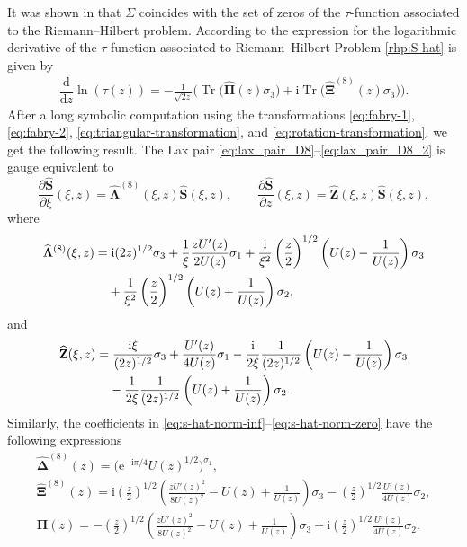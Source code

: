 \documentclass[pdftex]{sigma}
\numberwithin{equation}{section}
\newcommand{\ee}{\mathrm{e}}
\newcommand{\ii}{\mathrm{i}}
\newcommand{\Tr}{\operatorname{Tr}}
\begin{document}
It was shown in \cite{Palmer} that $\Sigma$ coincides with the set of zeros of the $\tau$-function associated to the Riemann--Hilbert problem. According to \cite{JMU} the expression for the logarithmic derivative of the $\tau$-function associated to Riemann--Hilbert Problem \ref{rhp:S-hat} is given by
\begin{gather} \label{eq:jmu-tau}
\dfrac{\mathrm{d}}{\mathrm{d}z}\ln(\tau(z))=-\frac{1}{\sqrt{2z}}\big(\Tr\big(\widehat{\mathbf{\Pi}}(z)\sigma_3\big)+\ii\Tr\big(\widehat{\mathbf{\Xi}}^{(8)}(z)\sigma_3\big)\big).
\end{gather}
 After a long symbolic computation using the transformations \eqref{eq:fabry-1}, \eqref{eq:fabry-2}, \eqref{eq:triangular-transformation}, and \eqref{eq:rotation-transformation}, we get the following result. The Lax pair \eqref{eq:lax_pair_D8}--\eqref{eq:lax_pair_D8_2} is gauge equivalent to
\[
\frac{\partial\widehat{\mathbf{S}}}{\partial\xi} (\xi, z) = {\widehat{\mathbf{\Lambda}}}^{(8)}(\xi, z) \widehat{\mathbf{S}}(\xi, z), \qquad
\frac{\partial\widehat{\mathbf{S}}}{\partial z} (\xi, z) = {\widehat{\mathbf{Z}}}(\xi, z) \widehat{\mathbf{S}}(\xi, z),
\]
where
\begin{align*}
&\widehat{\mathbf{\Lambda}}^{(8)}(\xi, z) = \ii(2z)^{1/2}\sigma_3 +\frac{1}{\xi}\frac{zU'(z)}{2U(z)}\sigma_1+\frac{\ii}{\xi^2}\left({\frac{z}{2}}\right)^{1/2}\left(U(z)-\frac{1}{U(z)}\right)\sigma_3\\
&\hphantom{\widehat{\mathbf{\Lambda}}^{(8)}(\xi, z) =}{}
+\frac{1}{\xi^2}\left({\frac{z}{2}}\right)^{1/2}\left(U(z)+\frac{1}{U(z)}\right)\sigma_2,
\end{align*}
and
\begin{align*}
&\widehat{\mathbf{Z}}(\xi, z) = \frac{\ii\xi}{(2z)^{1/2}}\sigma_3 +\frac{U'(z)}{4U(z)}\sigma_1-\frac{\ii}{2\xi}\frac{1}{(2z)^{1/2}}\left(U(z)-\frac{1}{U(z)}\right)\sigma_3\\
&\hphantom{\widehat{\mathbf{Z}}(\xi, z) =}{}
-\frac{1}{2\xi}\frac{1}{(2z)^{1/2}}\left(U(z)+\frac{1}{U(z)}\right)\sigma_2.
\end{align*}
Similarly, the coefficients in \eqref{eq:s-hat-norm-inf}--\eqref{eq:s-hat-norm-zero} have the following expressions
\begin{gather}
\widehat{\mathbf{\Delta}}^{(8)}(z)=\big(\ee^{-\ii\pi/4}U(z)^{1/2}\big)^{\sigma_1},\nonumber\\
\widehat{\mathbf{\Xi}}^{(8)}(z)=\ii\left(\frac{z}{2}\right)^{1/2}\left(\frac{zU'(z)^2}{8U(z)^2}-
 U(z)+\frac1{U(z)}\right)\sigma_3-\left(\frac{z}{2}\right)^{1/2}\frac{U'(z)}{4U(z)}\sigma_2,\nonumber\\
 \widehat{\mathbf{\Pi}}(z)=-\left(\frac{z}{2}\right)^{1/2}\left(\frac{zU'(z)^2}{8U(z)^2}-
 U(z)+\frac1{U(z)}\right)\sigma_3+\ii\left(\frac{z}{2}\right)^{1/2}\frac{U'(z)}{4U(z)}\sigma_2.\label{eq:s-hat-residues}
\end{gather}
\end{document}
